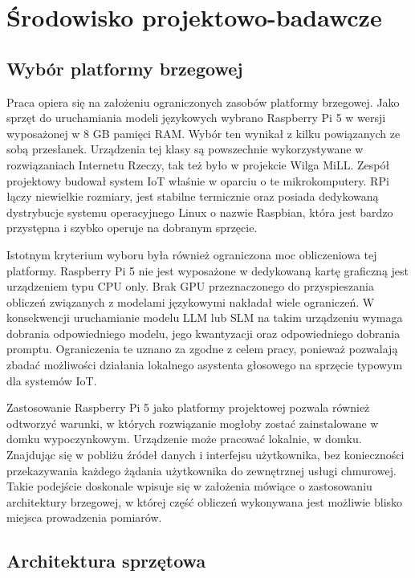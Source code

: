 \newpage
\section{Środowisko projektowo-badawcze}

\subsection{Wybór platformy brzegowej}


Praca opiera się na założeniu ograniczonych zasobów platformy brzegowej. Jako sprzęt do uruchamiania modeli językowych wybrano Raspberry Pi 5 w wersji wyposażonej w 8 GB pamięci RAM. Wybór ten wynikał z kilku powiązanych ze sobą przesłanek. Urządzenia tej klasy są powszechnie wykorzystywane w rozwiązaniach Internetu Rzeczy, tak też było w projekcie Wilga MiLL. Zespół projektowy budował system IoT właśnie w oparciu o te mikrokomputery. RPi łączy niewielkie rozmiary, jest stabilne termicznie oraz posiada dedykowaną dystrybucje systemu operacyjnego Linux o nazwie Raspbian, która jest bardzo przystępna i szybko operuje na dobranym sprzęcie.

Istotnym kryterium wyboru była również ograniczona moc obliczeniowa tej platformy. Raspberry Pi 5 nie jest wyposażone w dedykowaną kartę graficzną jest urządzeniem typu CPU only. Brak GPU przeznaczonego do przyspieszania obliczeń związanych z modelami językowymi nakładał wiele ograniczeń. W konsekwencji uruchamianie modelu LLM lub SLM na takim urządzeniu wymaga dobrania odpowiedniego modelu, jego kwantyzacji oraz odpowiedniego dobrania promptu. Ograniczenia te uznano za zgodne z celem pracy, ponieważ pozwalają zbadać możliwości działania lokalnego asystenta głosowego na sprzęcie typowym dla systemów IoT.

Zastosowanie Raspberry Pi 5 jako platformy projektowej pozwala również odtworzyć warunki, w których rozwiązanie mogłoby zostać zainstalowane w domku wypoczynkowym. Urządzenie może pracować lokalnie, w domku. Znajdując się w pobliżu źródeł danych i interfejsu użytkownika, bez konieczności przekazywania każdego żądania użytkownika do zewnętrznej usługi chmurowej. Takie podejście doskonale wpisuje się w założenia mówiące o zastosowaniu architektury brzegowej, w której część obliczeń wykonywana jest możliwie blisko miejsca prowadzenia pomiarów.

\subsection{Architektura sprzętowa}

